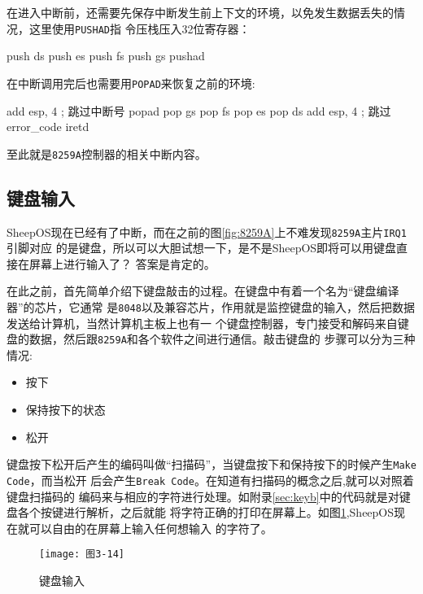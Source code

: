 在进入中断前，还需要先保存中断发生前上下文的环境，以免发生数据丢失的情况，这里使用\texttt{PUSHAD}指
令压栈压入32位寄存器：
\begin{codeblock}
\begin{nasmcode}
   push ds
   push es
   push fs
   push gs
   pushad
\end{nasmcode}  
\end{codeblock}

在中断调用完后也需要用\texttt{POPAD}来恢复之前的环境:
\begin{codeblock}
\begin{nasmcode}
add esp, 4    ; 跳过中断号
   popad
   pop gs
   pop fs
   pop es
   pop ds
   add esp, 4 ; 跳过error_code
   iretd
\end{nasmcode}  
\end{codeblock}

至此就是\texttt{8259A}控制器的相关中断内容。

\subsection{键盘输入}

SheepOS现在已经有了中断，而在之前的图\ref{fig:8259A}上不难发现\texttt{8259A}主片\texttt{IRQ1}引脚对应
的是键盘，所以可以大胆试想一下，是不是SheepOS即将可以用键盘直接在屏幕上进行输入了？
答案是肯定的。

在此之前，首先简单介绍下键盘敲击的过程。在键盘中有着一个名为“键盘编译器”的芯片，它通常
是\texttt{8048}以及兼容芯片，作用就是监控键盘的输入，然后把数据发送给计算机，当然计算机主板上也有一
个键盘控制器，专门接受和解码来自键盘的数据，然后跟\texttt{8259A}和各个软件之间进行通信。敲击键盘的
步骤可以分为三种情况:
\begin{itemize}
\item 按下
\item 保持按下的状态
\item 松开
\end{itemize}
键盘按下松开后产生的编码叫做“扫描码”，当键盘按下和保持按下的时候产生\texttt{Make Code}，而当松开
后会产生\texttt{Break Code}。在知道有扫描码的概念之后,就可以对照着键盘扫描码的
编码来与相应的字符进行处理。如附录\ref{sec:keyb}中的代码就是对键盘各个按键进行解析，之后就能
将字符正确的打印在屏幕上。如图\ref{fig:keybd},SheepOS现在就可以自由的在屏幕上输入任何想输入
的字符了。
\begin{figure}[H]
  \centering
  \texttt{[image: 图3-14]}
  \caption{键盘输入}
  \label{fig:keybd}
\end{figure}

